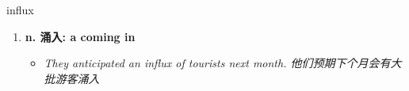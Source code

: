 
\begin{frame}
{\huge influx}
\begin{center}
\begin{enumerate}\Large
  \item \textbf{n. 涌入: a coming in}
  \begin{itemize}
    \item \em{\Large{They anticipated an influx of tourists next month. 他们预期下个月会有大批游客涌入}}
  \end{itemize}
\end{enumerate}
\end{center}
\end{frame}
